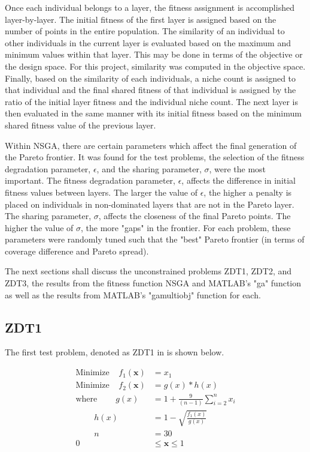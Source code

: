 \documentclass{article}
\begin{document}
\noindent Once each individual belongs to a layer, the fitness assignment is accomplished layer-by-layer. The initial fitness of the first layer is assigned based on the number of points in the entire population. The similarity of an individual to other individuals in the current layer is evaluated based on the maximum and minimum values within that layer. This may be done in terms of the objective or the design space. For this project, similarity was computed in the objective space. Finally, based on the similarity of each individuals, a niche count is assigned to that individual and the final shared fitness of that individual is assigned by the ratio of the initial layer fitness and the individual niche count. The next layer is then evaluated in the same manner with its initial fitness based on the minimum shared fitness value of the previous layer. \newline 

\noindent Within NSGA, there are certain parameters which affect the final generation of the Pareto frontier. It was found for the test problems, the selection of the fitness degradation parameter, $\epsilon$, and the sharing parameter, $\sigma$, were the most important. The fitness degradation parameter, $\epsilon$, affects the difference in initial fitness values between layers. The larger the value of $\epsilon$, the higher a penalty is placed on individuals in non-dominated layers that are not in the Pareto layer. The sharing parameter, $\sigma$, affects the closeness of the final Pareto points. The higher the value of $\sigma$, the more "gaps" in the frontier. For each problem, these parameters were randomly tuned such that the "best" Pareto frontier (in terms of coverage difference and Pareto spread). \newline

\noindent The next sections shall discuss the unconstrained problems ZDT1, ZDT2, and ZDT3, the results from the fitness function NSGA and MATLAB's "ga" function as well as the results from MATLAB's "gamultiobj" function for each. 
\newpage
\subsection{ZDT1} 
The first test problem, denoted as ZDT1 in \cite{deb2001multi} is shown below. 


\begin{align*}
\textrm{Minimize} ~~~~~ f_1(\textbf{x}) &= x_1 \\
\textrm{Minimize} ~~~~~ f_2(\textbf{x}) &= g(x)*h(x) \\
\textrm{where} ~~~~~~~~~~ g(x) &= 1+\frac{9}{(n-1)}\sum_{i=2}^{n}x_i \\
~~~~~~~~~~ h(x) &= 1- \sqrt{\frac{f_1(x)}{g(x)}} \\
~~~~~~~~~~ n &= 30 \\
0 &\leq  \textbf{x}  \leq 1 \\
\end{align*}
\end{document}
